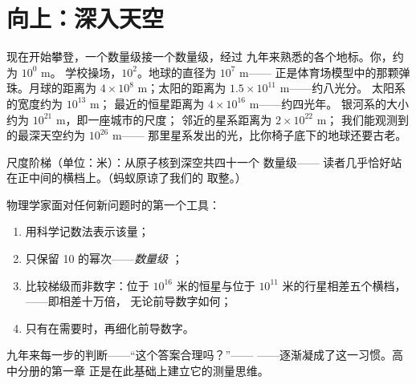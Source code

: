 \section{向上：深入天空}

\begin{example}[攀登]\label{ex:g9:atoms-to-galaxies:ascent}
现在开始攀登，一个数量级接一个数量级，经过
九年来熟悉的各个地标。你，约为 $10^{0}$ \unit{m}。
学校操场，$10^{2}$。地球的直径为 $10^{7}$ \unit{m}——
正是体育场模型中的那颗弹珠。月球的距离为
$4 \times 10^{8}$ \unit{m}；太阳的距离为 $1.5 \times 10^{11}$ \unit{m}——约八光分。
太阳系的宽度约为 $10^{13}$ \unit{m}；
最近的恒星距离为 $4 \times 10^{16}$ \unit{m}——约四光年。
银河系的大小约为 $10^{21}$ \unit{m}，即一座城市的尺度；
邻近的星系距离为 $2 \times 10^{22}$ \unit{m}；
我们能观测到的最深天空约为 $10^{26}$ \unit{m}——
那里星系发出的光，比你椅子底下的地球还要古老。
\end{example}

\begin{omfigure}

{\small 尺度阶梯（单位：米）：从原子核到深空共四十一个
数量级——
读者几乎恰好站在正中间的横档上。（蚂蚁原谅了我们的
取整。）}
\end{omfigure}

\begin{method}[用数量级思考]\label{met:g9:atoms-to-galaxies:oom}
物理学家面对任何新问题时的第一个工具：
\begin{enumerate}
  \item 用科学记数法表示该量；
  \item 只保留 10 的幂次——\emph{数量级
        }；
  \item 比较梯级而非数字：位于 $10^{16}$
        米的恒星与位于 $10^{11}$ 米的行星相差五个横档，
        ——即相差十万倍，
        无论前导数字如何；
  \item 只有在需要时，再细化前导数字。
\end{enumerate}
九年来每一步的判断——“这个答案合理吗？”——
——逐渐凝成了这一习惯。高中分册的第一章
正是在此基础上建立它的测量思维。
\end{method}

